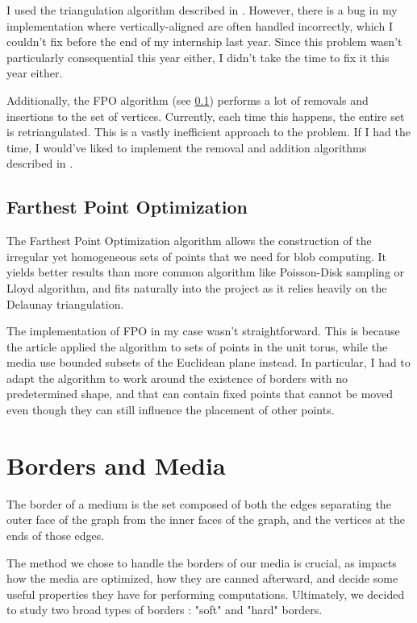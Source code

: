 \documentclass{article}
\begin{document}
I used the triangulation algorithm described in \cite{build_delaunay}. However, there is a bug in my implementation where vertically-aligned are often handled incorrectly, which I couldn't fix before the end of my internship last year. Since this problem wasn't particularly consequential this year either, I didn't take the time to fix it this year either.

Additionally, the FPO algorithm (see \ref{fpo}) performs a lot of removals and insertions to the set of vertices. Currently, each time this happens, the entire set is retriangulated. This is a vastly inefficient approach to the problem. If I had the time, I would've liked to implement the removal and addition algorithms described in \cite{build_delaunay, remove_delaunay}.

\subsection{Farthest Point Optimization}
\label{fpo}

The Farthest Point Optimization algorithm \supercite{FPO} allows the construction of the irregular yet homogeneous sets of points that we need for blob computing. It yields better results than more common algorithm like Poisson-Disk sampling or Lloyd algorithm, and fits naturally into the project as it relies heavily on the Delaunay triangulation.

The implementation of FPO in my case wasn't straightforward. This is because the article applied the algorithm to sets of points in the unit torus, while the media use bounded subsets of the Euclidean plane instead. In particular, I had to adapt the algorithm to work around the existence of borders with no predetermined shape, and that can contain fixed points that cannot be moved even though they can still influence the placement of other points.

\renewcommand{\thesection}{\arabic{section}}
\setcounter{section}{0}

\section{Borders and Media}

The border of a medium is the set composed of both the edges separating the outer face of the graph from the inner faces of the graph, and the vertices at the ends of those edges.

The method we chose to handle the borders of our media is crucial, as impacts how the media are optimized, how they are canned afterward, and decide some useful properties they have for performing computations. Ultimately, we decided to study two broad types of borders : "soft" and "hard" borders.
\end{document}
